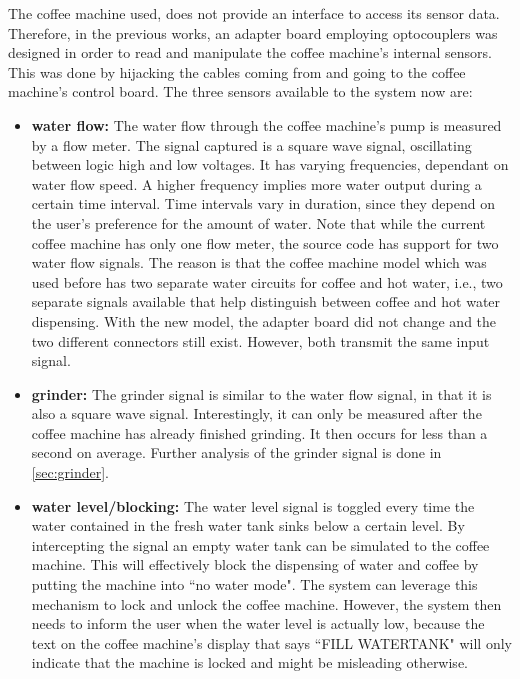 \documentclass[12pt]{article}
\begin{document}
The coffee machine used, does not provide an interface to access its sensor data.
Therefore, in the previous works, an adapter board employing optocouplers
was designed in order to read and manipulate the coffee machine's internal sensors.
This was done by hijacking the cables coming from and going to the coffee machine's control board.
The three sensors available to the system now are:
\begin{itemize}
  \item \textbf{water flow:}
        The water flow through the coffee machine's pump is measured by a flow meter.
        The signal captured is a square wave signal, oscillating between logic high and low voltages.
        It has varying frequencies, dependant on water flow speed. A higher frequency implies more water output during a certain time interval.
        Time intervals vary in duration, since they depend on the user's preference for the amount of water.
        Note that while the current coffee machine has only one flow meter,
        the source code has support for two water flow signals.
        The reason is that the coffee machine model which was used before
        has two separate water circuits for coffee and hot water, i.e.,
        two separate signals available that help distinguish between coffee and hot water dispensing.
        With the new model, the adapter board did not change and the two different connectors still exist.
        However, both transmit the same input signal.

  \item \textbf{grinder:} The grinder signal is similar to the water flow signal, in that it is also a square wave signal.
        Interestingly, it can only be measured after the coffee machine has already finished grinding. 
        It then occurs for less than a second on average.
        Further analysis of the grinder signal is done in \autoref{sec:grinder}.
  \item \textbf{water level/blocking:} The water level signal is toggled every time
        the water contained in the fresh water tank sinks below a certain level.
        By intercepting the signal an empty water tank can be simulated to the coffee machine.
        This will effectively block the dispensing of water and coffee by putting the machine into ``no water mode".
        The system can leverage this mechanism to lock and unlock the coffee machine.
        However, the system then needs to inform the user when the water level is actually low,
        because the text on the coffee machine's display that says ``FILL WATERTANK" 
        will only indicate that the machine is locked and might be misleading otherwise.
\end{itemize} \label{itm:waterflow}
\end{document}
